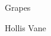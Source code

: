 \documentclass[11pt,twoside,openright]{book}
\begin{document}
\frontmatter
\begin{titlepage}
  \centering
  \vspace*{0.3\textheight}
  {\Huge Grapes}\par
  \bigskip
  {\large Hollis Vane}\par
  \vfill
\end{titlepage}

\mainmatter

\end{document}
